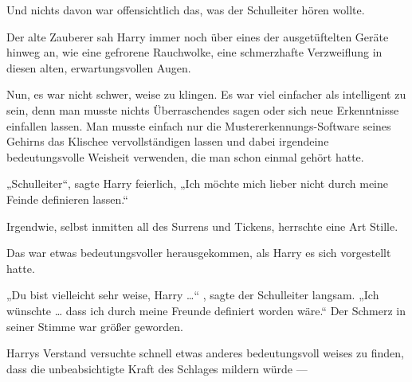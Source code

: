 Und nichts davon war offensichtlich das, was der Schulleiter hören wollte.

Der alte Zauberer sah Harry immer noch über eines der ausgetüftelten Geräte hinweg an, wie eine gefrorene Rauchwolke, eine schmerzhafte Verzweiflung in diesen alten, erwartungsvollen Augen.

Nun, es war nicht schwer, weise zu klingen. Es war viel einfacher als intelligent zu sein, denn man musste nichts Überraschendes sagen oder sich neue Erkenntnisse einfallen lassen. Man musste einfach nur die Mustererkennungs-Software seines Gehirns das Klischee vervollständigen lassen und dabei irgendeine bedeutungsvolle Weisheit verwenden, die man schon einmal gehört hatte.

„Schulleiter“, sagte Harry feierlich,
„Ich möchte mich lieber nicht durch meine Feinde definieren lassen.“

Irgendwie, selbst inmitten all des Surrens und Tickens, herrschte eine Art Stille.

Das war etwas bedeutungsvoller herausgekommen, als Harry es sich vorgestellt hatte.

„Du bist vielleicht sehr weise, Harry …“ , sagte der Schulleiter langsam.
„Ich wünschte … dass ich durch meine Freunde definiert worden wäre.“ Der Schmerz in seiner Stimme war größer geworden.

Harrys Verstand versuchte schnell etwas anderes bedeutungsvoll weises zu finden, dass die unbeabsichtigte Kraft des Schlages mildern würde —

